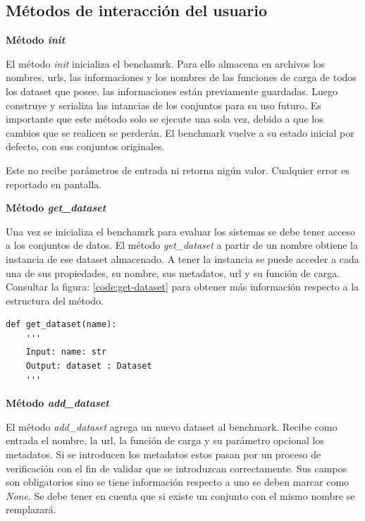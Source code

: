 \subsection{Métodos de interacción del usuario}\label{subsection:methods}

\begin{flushleft} 
    { \textbf{ Método \textit{init}}}\label{method:create}
\end{flushleft}
El método \textit{init} inicializa el benchamrk. Para ello almacena en archivos los nombres, urls, las informaciones y los nombres de las funciones de carga de todos 
los dataset que posee. las informaciones están previamente guardadas. 
Luego construye y serializa las intancias de los conjuntos para su uso futuro. Es importante que este método solo se ejecute una sola vez, debido a que los cambios 
que se realicen se perderán. El benchmark vuelve a su estado inicial por defecto, con sus conjuntos originales.

Este no recibe parámetros de entrada ni retorna nigún valor. Cualquier error es reportado en pantalla.

\begin{flushleft} 
    { \textbf{Método \textit{get\_dataset}}}\label{method:get-dataset}
\end{flushleft}

Una vez se inicializa el benchamrk para evaluar los sistemas se debe tener acceso a los conjuntos de datos.
El método \textit{get\_dataset} a partir de un nombre obtiene la instancia de ese dataset almacenado.
A tener la instancia se puede acceder a cada una de sus propiedades, su nombre, sus metadatos, url y su 
función de carga.  
Consultar la figura: \ref{code:get-dataset} para obtener más información respecto a la estructura del método. 



\begin{lstlisting}[caption= Método init,label = code:get-dataset]
def get_dataset(name):
    '''
    Input: name: str 
    Output: dataset : Dataset
    ''' 
\end{lstlisting}
  
\begin{flushleft} 
    { \textbf{Método \textit{add\_dataset} }}\label{method:new}
\end{flushleft}
El método \textit{add\_dataset} agrega un nuevo dataset al benchmark. 
Recibe como entrada el nombre, la url, la función de carga y su parámetro opcional los metadatos.
Si se introducen los metadatos estos pasan por un proceso de verificación con el fin de validar que se introduzcan correctamente.
Sus campos son obligatorios sino se tiene información respecto a uno se deben marcar como \textit{None}.
Se debe tener en cuenta que si existe un conjunto con el mismo nombre se remplazará.


